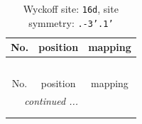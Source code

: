 \documentclass[fleqn,8pt]{jsarticle}
\begin{document}
\renewcommand{\arraystretch}{1.2}
\begin{longtable}{ccc}
\caption{Wyckoff site: {\tt 16d}, site symmetry: {\tt .-3'.1'}}
 \\
 \hline \hline
No. & position & mapping \\ \hline \endfirsthead

\multicolumn{2}{l}{\tablename\ \thetable{}} \\
 \hline \hline
No. & position & mapping \\ \hline \endhead

 \hline \hline
\multicolumn{2}{r}{\footnotesize\it continued ...} \\ \endfoot

 \hline \hline
\multicolumn{2}{r}{} \\ \endlastfoot


\end{longtable}
\end{document}

